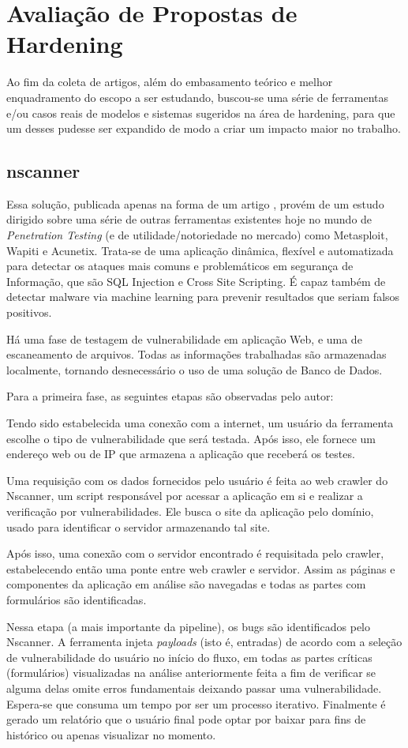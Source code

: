 \section{Avaliação de Propostas de Hardening}
Ao fim da coleta de artigos, além do embasamento teórico e melhor enquadramento do escopo a ser estudando, buscou-se uma série de ferramentas e/ou casos reais de modelos e sistemas sugeridos na área de hardening, para que um desses pudesse ser expandido de modo a criar um impacto maior no trabalho.

\subsection{nscanner}
Essa solução, publicada apenas na forma de um artigo \cite{surian_nscanner_2020}, provém de um estudo dirigido sobre uma série de outras ferramentas existentes hoje no mundo de \textit{Penetration Testing} (e de utilidade/notoriedade no mercado) como Metasploit, Wapiti e Acunetix. Trata-se de uma aplicação dinâmica, flexível e automatizada para detectar os ataques mais comuns e problemáticos em segurança de Informação, que são SQL Injection e Cross Site Scripting. É capaz também de detectar malware via machine learning para prevenir resultados que seriam falsos positivos.

Há uma fase de testagem de vulnerabilidade em aplicação Web, e uma de escaneamento de arquivos. Todas as informações trabalhadas são armazenadas localmente, tornando desnecessário o uso de uma solução de Banco de Dados. 

Para a primeira fase, as seguintes etapas são observadas pelo autor:
\begin{alineas}
\item Tendo sido estabelecida uma conexão com a internet, um usuário da ferramenta escolhe o tipo de vulnerabilidade que será testada. Após isso, ele fornece um endereço web ou de IP que armazena a aplicação que receberá os testes.
\item Uma requisição com os dados fornecidos pelo usuário é feita ao web crawler do Nscanner, um script responsável por acessar a aplicação em si e realizar a verificação por vulnerabilidades. Ele busca o site da aplicação pelo domínio, usado para identificar o servidor armazenando tal site.
\item Após isso, uma conexão com o servidor encontrado é requisitada pelo crawler, estabelecendo então uma ponte entre web crawler e servidor. Assim as páginas e componentes da aplicação em análise são navegadas e todas as partes com formulários são identificadas.
\item Nessa etapa (a mais importante da pipeline), os bugs são identificados pelo Nscanner. A ferramenta injeta \textit{payloads} (isto é, entradas) de acordo com a seleção de vulnerabilidade do usuário no início do fluxo, em todas as partes críticas (formulários) visualizadas na análise anteriormente feita a fim de verificar se alguma delas omite erros fundamentais deixando passar uma vulnerabilidade. Espera-se que consuma um tempo por ser um processo iterativo. Finalmente é gerado um relatório que o usuário final pode optar por baixar para fins de histórico ou apenas visualizar no momento.
\end{alineas}

